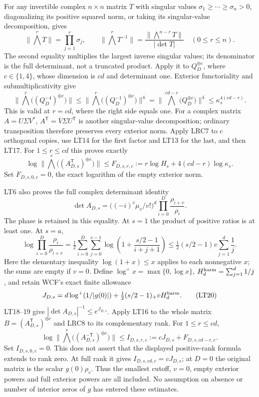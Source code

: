 \documentclass[11pt,a4paper]{article}
\begin{document}
For any invertible complex $n\times n$ matrix $T$ with singular
values $\sigma_1\ge\cdots\ge\sigma_n>0$, diagonalizing its
positive squared norm, or taking its singular-value decomposition,
gives
\[
 \|\textstyle\bigwedge^rT\|=\prod_{j=1}^r\sigma_j,
 \qquad
 \|\textstyle\bigwedge^rT^{-1}\|
 =\frac{\|\bigwedge^{n-r}T\|}{|\det T|}
 \quad(0\le r\le n).                                  \tag{LT16}
\]
The second equality multiplies the largest inverse singular values;
its denominator is the full determinant, not a truncated product.
Apply it to $Q_D^{\oplus c}$, where $c\in\{1,4\}$, whose dimension
is $cd$ and determinant one. Exterior functoriality and
submultiplicativity give
\[
 \|\bigwedge^r\bigl((Q_D^{-4})^{\oplus c}\bigr)\|
 \le\|\bigwedge^r\bigl((Q_D^{-1})^{\oplus c}\bigr)\|^4
 =\|\bigwedge^{cd-r}\bigl(Q_D^{\oplus c}\bigr)\|^4
 \le\kappa_s^{4(cd-r)}.                                 \tag{LT17}
\]
This is valid at $r=cd$, where the right side equals one.
For a complex matrix $A=U\Sigma V^*$,
$A^{\mathsf T}=\overline V\Sigma U^{\mathsf T}$ is another
singular-value decomposition; ordinary transposition therefore
preserves every exterior norm. Apply LRC7 to $c$ orthogonal copies,
use LT14 for the first factor and LT13 for the last, and then LT17.
For $1\le r\le cd$ this proves exactly
\[
 \boxed{\log\|\bigwedge^r\bigl((A_{D,s}^{\mathsf T})^{\oplus c}\bigr)\|
 \le F_{D,s,r,c}:=r\log H_s+4(cd-r)\log\kappa_s.}         \tag{LRC8}
\]
Set $F_{D,s,0,c}=0$, the exact logarithm of the empty exterior norm.

LT6 also proves the full complex determinant identity
\[
 \det A_{D,s}=\bigl((-i)^v\mu_v/v!\bigr)^d
                         \prod_{i=0}^{D}\frac{\rho_{i+v}}{\rho_i}.
                                                               \tag{LT18}
\]
The phase is retained in this equality. At $s=1$ the product of
positive ratios is at least one. At $s=a$,
\[
 \log\prod_{i=0}^{D}\frac{\rho_i}{\rho_{i+v}}
 =\tfrac12\sum_{i=0}^{D}\sum_{j=0}^{v-1}
       \log\left(1+\frac{s/2-1}{i+j+1}\right)
 \le\tfrac12(s/2-1)v\sum_{j=1}^d\frac1j .                \tag{LT19}
\]
Here the elementary inequality $\log(1+x)\le x$ applies to each
nonnegative $x$; the sums are empty if $v=0$.
Define $\log^+x=\max\{0,\log x\}$, $H_d^{\rm harm}=\sum_{j=1}^d1/j$,
and retain WCF's exact finite allowance
\[
 J_{D,s}=d\log^+(1/|g(0)|)
       +\tfrac12(s/2-1)_+vH_d^{\rm harm}.                \tag{LT20}
\]
LT18--19 give $|\det A_{D,s}|^{-1}\le e^{J_{D,s}}$.
Apply LT16 to the whole matrix
$B=(A_{D,s}^{\mathsf T})^{\oplus c}$ and LRC8 to its complementary
rank. For $1\le r\le cd$,
\[
 \boxed{\log\|\bigwedge^r\bigl((A_{D,s}^{-\mathsf T})^{\oplus c}\bigr)\|
 \le I_{D,s,r,c}:=cJ_{D,s}+F_{D,s,cd-r,c}.}              \tag{LRC9}
\]
Set $I_{D,s,0,c}=0$. This does not assert that the displayed
positive-rank formula extends to rank zero. At full rank it gives
$I_{D,s,cd,c}=cJ_{D,s}$; at $D=0$ the original matrix is the scalar
$g(0)\rho_v$. Thus the smallest cutoff, $v=0$, empty exterior powers
and full exterior powers are all included. No assumption on absence
or number of interior zeros of $g$ has entered these estimates.
\end{document}

